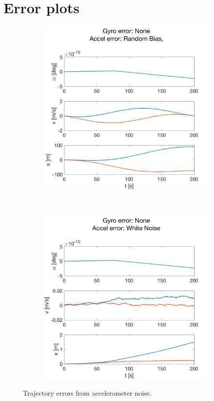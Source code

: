 \documentclass{article}
\begin{document}
\section*{Error plots}
\begin{figure}[H]
    \centering
    \begin{subfigure}[t]{0.49\textwidth}
        \centering
        \includegraphics[width=\textwidth]{fig/accel_bc}
        \caption{}
    \end{subfigure}
    ~
    \begin{subfigure}[t]{0.49\textwidth}
        \centering
        \includegraphics[width=\textwidth]{fig/accel_wn}
        \caption{}
    \end{subfigure}
    \caption{Trajectory errors from accelerometer noise.}
    \label{fig:error_accel_1}
\end{figure}
\end{document}
